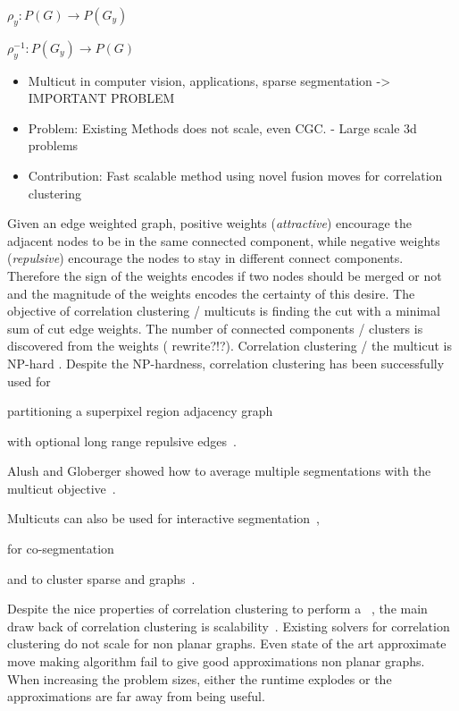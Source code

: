 \documentclass[10pt,twocolumn,letterpaper]{article}
\begin{document}

$\rho_y : P(G) \to P(G_y)$


$\rho_y^{-1} : P(G_y) \to P(G)$
\begin{itemize}
  \item Multicut in computer vision, applications, sparse segmentation -> IMPORTANT PROBLEM
  \item Problem: Existing Methods does not scale, even CGC. - Large scale 3d problems
  \item Contribution: Fast scalable method using novel fusion moves for correlation clustering
\end{itemize}



Given an edge weighted graph, positive weights (\emph{attractive})
encourage the adjacent nodes to be in the same 
connected component, while negative weights (\emph{repulsive}) encourage
the nodes to stay in different connect components.
Therefore the sign of the weights encodes if two
nodes should be merged or not and the magnitude of the weights encodes
the certainty of this desire.
The objective of correlation clustering / multicuts
is finding the cut with a minimal sum of cut edge weights.
The number of connected components / clusters is discovered
from the weights ( rewrite?!?).
Correlation clustering / the multicut is NP-hard \cite{???}.
%
Despite the NP-hardness, correlation clustering has been 
successfully used for
\begin{inparaenum}[(i)]
    \item partitioning a superpixel region adjacency graph~\cite{andres_2011_iccv,kroeger_2012_eccv}
    \item with optional long range repulsive edges~\cite{andres_2013_emmcvpr}.
    \item Alush and Globerger showed how to average multiple segmentations with the multicut objective~\cite{alush_2012_pami}.
    \item Multicuts can also be used for interactive segmentation~\cite{bagon_2011_arxiv},
    \item for co-segmentation~\cite{glassner_2011_cvpr}
    \item and to cluster sparse and graphs~\cite{???}.
\end{inparaenum}


Despite the nice properties of correlation clustering
to perform a  ~\cite{nunez_iglesias_2013},
the main draw back of correlation clustering is scalability~\cite{nunez_iglesias_2013}.
Existing solvers for correlation clustering do not scale for non planar graphs.
Even state of the art approximate move making algorithm fail 
to give good approximations non planar graphs.
When increasing the problem sizes, either the runtime explodes or the 
approximations are far away from being useful.
\end{document}
